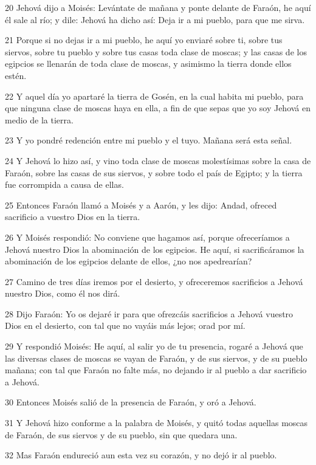 \par 20 Jehová dijo a Moisés: Levántate de mañana y ponte delante de Faraón, he aquí él sale al río; y dile: Jehová ha dicho así: Deja ir a mi pueblo, para que me sirva.
\par 21 Porque si no dejas ir a mi pueblo, he aquí yo enviaré sobre ti, sobre tus siervos, sobre tu pueblo y sobre tus casas toda clase de moscas; y las casas de los egipcios se llenarán de toda clase de moscas, y asimismo la tierra donde ellos estén.
\par 22 Y aquel día yo apartaré la tierra de Gosén, en la cual habita mi pueblo, para que ninguna clase de moscas haya en ella, a fin de que sepas que yo soy Jehová en medio de la tierra.
\par 23 Y yo pondré redención entre mi pueblo y el tuyo. Mañana será esta señal.
\par 24 Y Jehová lo hizo así, y vino toda clase de moscas molestísimas sobre la casa de Faraón, sobre las casas de sus siervos, y sobre todo el país de Egipto; y la tierra fue corrompida a causa de ellas.
\par 25 Entonces Faraón llamó a Moisés y a Aarón, y les dijo: Andad, ofreced sacrificio a vuestro Dios en la tierra.
\par 26 Y Moisés respondió: No conviene que hagamos así, porque ofreceríamos a Jehová nuestro Dios la abominación de los egipcios. He aquí, si sacrificáramos la abominación de los egipcios delante de ellos, ¿no nos apedrearían?
\par 27 Camino de tres días iremos por el desierto, y ofreceremos sacrificios a Jehová nuestro Dios, como él nos dirá.
\par 28 Dijo Faraón: Yo os dejaré ir para que ofrezcáis sacrificios a Jehová vuestro Dios en el desierto, con tal que no vayáis más lejos; orad por mí.
\par 29 Y respondió Moisés: He aquí, al salir yo de tu presencia, rogaré a Jehová que las diversas clases de moscas se vayan de Faraón, y de sus siervos, y de su pueblo mañana; con tal que Faraón no falte más, no dejando ir al pueblo a dar sacrificio a Jehová.
\par 30 Entonces Moisés salió de la presencia de Faraón, y oró a Jehová.
\par 31 Y Jehová hizo conforme a la palabra de Moisés, y quitó todas aquellas moscas de Faraón, de sus siervos y de su pueblo, sin que quedara una.
\par 32 Mas Faraón endureció aun esta vez su corazón, y no dejó ir al pueblo.

